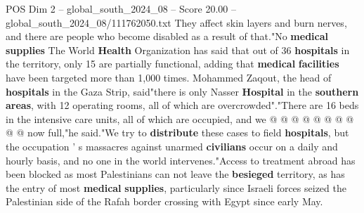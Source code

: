 \begin{textsample}{POS Dim 2 – global\_south\_2024\_08 – Score 20.00 – global\_south\_2024\_08/111762050.txt}
They affect skin layers and burn nerves, and there are people who become disabled as a result of that."No \textbf{medical} \textbf{supplies} The World \textbf{Health} Organization has said that out of 36 \textbf{hospitals} in the territory, only 15 are partially functional, adding that \textbf{medical} \textbf{facilities} have been targeted more than 1,000 times.
Mohammed Zaqout, the head of \textbf{hospitals} in the Gaza Strip, said"there is only Nasser \textbf{Hospital} in the \textbf{southern} \textbf{areas}, with 12 operating rooms, all of which are overcrowded"."There are 16 beds in the intensive care units, all of which are occupied, and we @ @ @ @ @ @ @ @ @ @ now full,"he said."We try to \textbf{distribute} these cases to field \textbf{hospitals}, but the occupation ' s massacres against unarmed \textbf{civilians} occur on a daily and hourly basis, and no one in the world intervenes."Access to treatment abroad has been blocked as most Palestinians can not leave the \textbf{besieged} territory, as has the entry of most \textbf{medical} \textbf{supplies}, particularly since Israeli forces seized the Palestinian side of the Rafah border crossing with Egypt since early May.

\end{textsample}
